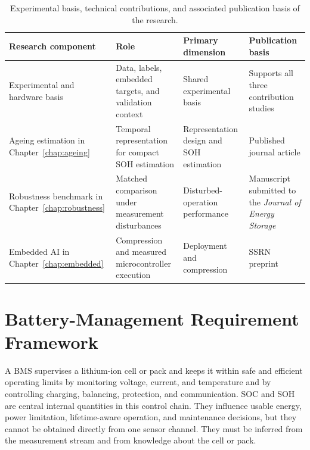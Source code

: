 \documentclass[
    a4paper,
    12pt,
    titlepage,
    bibliography=totoc,
    twoside=on,
    parskip=false,
    numbers=noenddot,
    cleardoublepage=empty,
    DIV=12,
    BCOR=12.0mm,
    headheight=36pt,
    headings=openright
]{scrreprt}
\begin{document}
\begin{table}[htbp]
    \centering
    \small
    \setlength{\tabcolsep}{3.5pt}
    \caption[Research components and publication basis.]{Experimental basis, technical contributions, and associated publication basis of the research.}
    \label{tab:publication_map}
    \begin{tabularx}{\textwidth}{>{\raggedright\arraybackslash}p{3.0cm}>{\raggedright\arraybackslash}p{4.3cm}>{\raggedright\arraybackslash}p{3.2cm}>{\raggedright\arraybackslash}X}
        \toprule
        Research component & Role & Primary dimension & Publication basis \\
        \midrule
        Experimental and hardware basis & Data, labels, embedded targets, and validation context & Shared experimental basis & Supports all three contribution studies \\
        Ageing estimation in Chapter~\ref{chap:ageing} & Temporal representation for compact SOH estimation & Representation design and SOH estimation & Published journal article\autocite{rzepkaNeuralNetworkArchitecture2023a} \\
        Robustness benchmark in Chapter~\ref{chap:robustness} & Matched comparison under measurement disturbances & Disturbed-operation performance & Manuscript submitted to the \emph{Journal of Energy Storage}\autocite{rzepkaPerformanceBenchmarkSubmitted2026} \\
        Embedded AI in Chapter~\ref{chap:embedded} & Compression and measured microcontroller execution & Deployment and compression & SSRN preprint\autocite{rzepkaEmbeddedArtificialIntelligence2026} \\
        \bottomrule
    \end{tabularx}
\end{table}

\section{Battery-Management Requirement Framework}
A BMS supervises a lithium-ion cell or pack and keeps it within safe and efficient operating limits by monitoring voltage, current, and temperature and by controlling charging, balancing, protection, and communication. SOC and SOH are central internal quantities in this control chain. They influence usable energy, power limitation, lifetime-aware operation, and maintenance decisions, but they cannot be obtained directly from one sensor channel. They must be inferred from the measurement stream and from knowledge about the cell or pack.\autocite{plettBatteryManagementSystems2015,zhouStateEstimationModels2023a,jiangAdvancesBatteryState2024}
\end{document}

